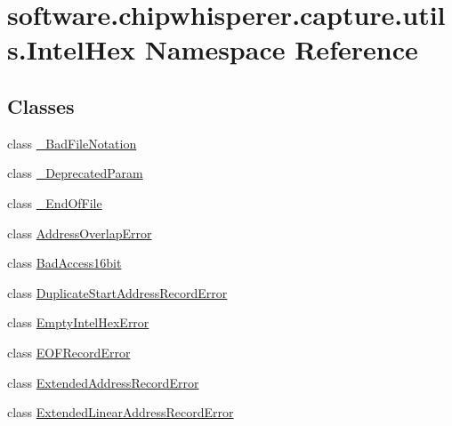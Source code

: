 \hypertarget{namespacesoftware_1_1chipwhisperer_1_1capture_1_1utils_1_1IntelHex}{}\section{software.\+chipwhisperer.\+capture.\+utils.\+Intel\+Hex Namespace Reference}
\label{namespacesoftware_1_1chipwhisperer_1_1capture_1_1utils_1_1IntelHex}
\subsection*{Classes}
\begin{DoxyCompactItemize}
\item 
class \hyperlink{classsoftware_1_1chipwhisperer_1_1capture_1_1utils_1_1IntelHex_1_1__BadFileNotation}{\+\_\+\+Bad\+File\+Notation}
\item 
class \hyperlink{classsoftware_1_1chipwhisperer_1_1capture_1_1utils_1_1IntelHex_1_1__DeprecatedParam}{\+\_\+\+Deprecated\+Param}
\item 
class \hyperlink{classsoftware_1_1chipwhisperer_1_1capture_1_1utils_1_1IntelHex_1_1__EndOfFile}{\+\_\+\+End\+Of\+File}
\item 
class \hyperlink{classsoftware_1_1chipwhisperer_1_1capture_1_1utils_1_1IntelHex_1_1AddressOverlapError}{Address\+Overlap\+Error}
\item 
class \hyperlink{classsoftware_1_1chipwhisperer_1_1capture_1_1utils_1_1IntelHex_1_1BadAccess16bit}{Bad\+Access16bit}
\item 
class \hyperlink{classsoftware_1_1chipwhisperer_1_1capture_1_1utils_1_1IntelHex_1_1DuplicateStartAddressRecordError}{Duplicate\+Start\+Address\+Record\+Error}
\item 
class \hyperlink{classsoftware_1_1chipwhisperer_1_1capture_1_1utils_1_1IntelHex_1_1EmptyIntelHexError}{Empty\+Intel\+Hex\+Error}
\item 
class \hyperlink{classsoftware_1_1chipwhisperer_1_1capture_1_1utils_1_1IntelHex_1_1EOFRecordError}{E\+O\+F\+Record\+Error}
\item 
class \hyperlink{classsoftware_1_1chipwhisperer_1_1capture_1_1utils_1_1IntelHex_1_1ExtendedAddressRecordError}{Extended\+Address\+Record\+Error}
\item 
class \hyperlink{classsoftware_1_1chipwhisperer_1_1capture_1_1utils_1_1IntelHex_1_1ExtendedLinearAddressRecordError}{Extended\+Linear\+Address\+Record\+Error}
\item 

\end{DoxyCompactItemize}
